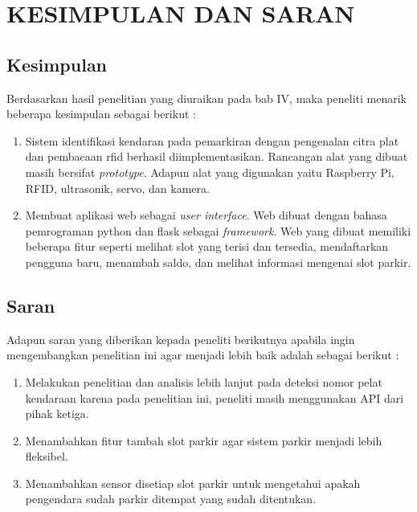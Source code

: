 \chapter{KESIMPULAN DAN SARAN}

\section{Kesimpulan}
Berdasarkan hasil penelitian yang diuraikan pada bab IV, maka peneliti menarik beberapa kesimpulan sebagai berikut :
\begin{enumerate}[topsep=0pt,itemsep=0pt,partopsep=0pt, parsep=0pt]
    \item Sistem identifikasi kendaran pada pemarkiran dengan pengenalan citra plat dan pembacaan rfid berhasil diimplementasikan. Rancangan alat yang dibuat masih bersifat \textit{prototype}. Adapun alat yang digunakan yaitu Raspberry Pi, RFID, ultrasonik, servo, dan kamera.
    \item Membuat aplikasi web sebagai \textit{user interface}. Web dibuat dengan bahasa pemrograman python dan flask sebagai \textit{framework}. Web yang dibuat memiliki beberapa fitur seperti melihat slot yang terisi dan tersedia, mendaftarkan pengguna baru, menambah saldo, dan melihat informasi mengenai slot parkir.
\end{enumerate}

\section{Saran}
Adapun saran yang diberikan kepada peneliti berikutnya apabila ingin mengembangkan penelitian ini agar menjadi lebih baik adalah sebagai berikut :
\begin{enumerate}[topsep=0pt,itemsep=0pt,partopsep=0pt, parsep=0pt]
    \item Melakukan penelitian dan analisis lebih lanjut pada deteksi nomor pelat kendaraan karena pada penelitian ini, peneliti masih menggunakan API dari pihak ketiga.
    \item Menambahkan fitur tambah slot parkir agar sistem parkir menjadi lebih fleksibel.
    \item Menambahkan sensor disetiap slot parkir untuk mengetahui apakah pengendara sudah parkir ditempat yang sudah ditentukan.
\end{enumerate}